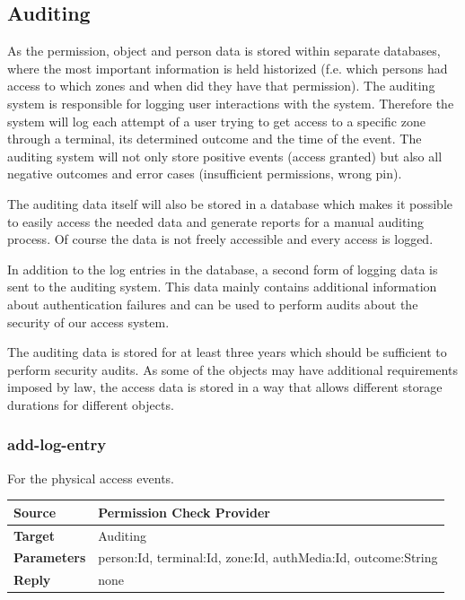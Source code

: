 \documentclass[12pt,a4paper,titlepage,oneside]{scrartcl}
\begin{document}
\subsection{Auditing}
As the permission, object and person data is stored within separate databases, where the most important information is held historized (f.e. which persons had access to which zones and when did they have that permission). The auditing system is responsible for logging user interactions with the system. Therefore the system will log each attempt of a user trying to get access to a specific zone through a terminal, its determined outcome and the time of the event. The auditing system will not only store positive events (access granted) but also all negative outcomes and error cases (insufficient permissions, wrong pin).

The auditing data itself will also be stored in a database which makes it possible to easily access the needed data and generate reports for a manual auditing process. Of course the data is not freely accessible and every access is logged.

In addition to the log entries in the database, a second form of logging data is sent to the auditing system. This data mainly contains additional information about authentication failures and can be used to perform audits about the security of our access system.

The auditing data is stored for at least three years which should be sufficient to perform security audits. As some of the objects may have additional requirements imposed by law, the access data is stored in a way that allows different storage durations for different objects.

\subsubsection{add-log-entry}
For the physical access events.

\begin{table}[h]
    \centering
    \begin{tabular}{|l|p{12cm}|} \hline
    \textbf{Source}&Permission Check Provider\\ \hline
    \textbf{Target}&Auditing\\ \hline
    \textbf{Parameters}&person:Id, terminal:Id, zone:Id, authMedia:Id, outcome:String\\ \hline
    \textbf{Reply}&none\\ \hline
    \end{tabular}
\end{table}
\end{document}
